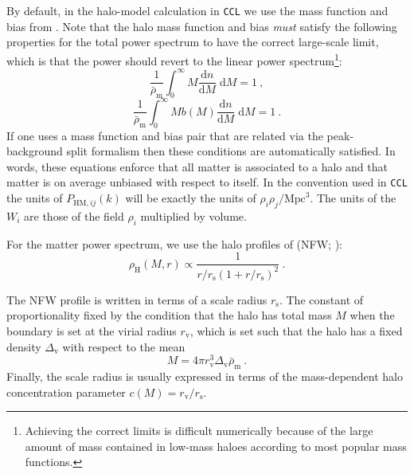 \documentclass[\docopts]{\docclass}
\newcommand{\elisa}[1]{\textcolor{green!10!orange!90!}{EC: #1}}
\newcommand{\Mead}[1]{\textcolor{red!50!cyan}{AM: #1}}
\newcommand{\ccl}{{\tt CCL}\xspace}
\begin{document}
By default, in the halo-model calculation in \ccl we use the mass function and bias from \cite{Sheth1999}. Note that the halo mass function and bias \emph{must} satisfy the following properties for the total power spectrum to have the correct large-scale limit, which is that the power should revert to the linear power spectrum\footnote{Achieving the correct limits is difficult numerically because of the large amount of mass contained in low-mass haloes according to most popular mass functions.}:
\begin{equation}
\frac{1}{\bar\rho_\mathrm{m}}\int_0^\infty M\frac{\mathrm{d}n}{\mathrm{d}M}\;\mathrm{d}M=1\ ,
\label{eq:mf_normalisation}
\end{equation}
\begin{equation}
\frac{1}{\bar\rho_\mathrm{m}}\int_0^\infty Mb(M)\frac{\mathrm{d}n}{\mathrm{d}M}\;\mathrm{d}M=1\ .
\label{eq:bias_normalisation}
\end{equation}
If one uses a mass function and bias pair that are related via the peak-background split formalism \citep{Mo1996,Sheth2001} then these conditions are automatically satisfied. In words, these equations enforce that all matter is associated to a halo and that matter is on average unbiased with respect to itself. In the convention used in \ccl the units of $P_{\mathrm{HM},ij}(k)$ will be exactly the units of $\rho_i\rho_j / \mathrm{Mpc}^3$. The units of the $W_i$ are those of the field $\rho_i$ multiplied by volume. 


For the matter power spectrum, we use the halo profiles of \citeauthor*{Navarro1997} (NFW; \citeyear{Navarro1997}):
\begin{equation}
\rho_\mathrm{H}(M,r)\propto\frac{1}{r/r_\mathrm{s}(1+r/r_\mathrm{s})^2}\ .
\label{eq:NFW_profile}
\end{equation}



The NFW profile is written in terms of a scale radius $r_\mathrm{s}$. The constant of proportionality fixed by the condition that the halo has total mass $M$ when the boundary is set at the virial radius $r_\mathrm{v}$, which is set such that the halo has a fixed density $\Delta_\mathrm{v}$  with respect to the mean
\begin{equation}
M=4\pi r_\mathrm{v}^3\Delta_\mathrm{v}\bar\rho_\mathrm{m}\ .
\label{eq:virial_radius}
\end{equation}
Finally, the scale radius is usually expressed in terms of the mass-dependent halo concentration parameter $c(M)=r_\mathrm{v}/r_\mathrm{s}$.
\end{document}
